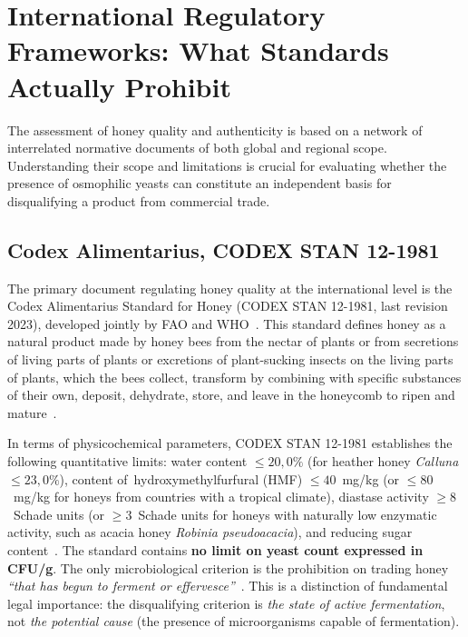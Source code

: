 
\section{International Regulatory Frameworks: What Standards Actually Prohibit}

The assessment of honey quality and authenticity is based on a network
of interrelated normative documents of both global and regional scope.
Understanding their scope and limitations is crucial for evaluating
whether the presence of osmophilic yeasts can constitute an independent
basis for disqualifying a product from commercial trade.

\subsection{Codex Alimentarius, CODEX STAN 12-1981}

The primary document regulating honey quality at the international
level is the Codex Alimentarius Standard for Honey
(CODEX STAN 12-1981, last revision 2023), developed jointly
by FAO and WHO~\cite{codex_stan12}. This standard defines honey
as a natural product made by honey bees from the nectar of plants
or from secretions of living parts of plants or excretions of
plant-sucking insects on the living parts of plants, which the bees
collect, transform by combining with specific substances of their own,
deposit, dehydrate, store, and leave in the honeycomb to ripen and
mature~\cite{codex_stan12}.

In terms of physicochemical parameters, CODEX STAN 12-1981 establishes
the following quantitative limits: water content $\leq 20{,}0\%$
(for heather honey \textit{Calluna} $\leq 23{,}0\%$), content
of~hydroxymethylfurfural (HMF) $\leq 40$~mg/kg (or $\leq 80$~mg/kg
for honeys from countries with a tropical climate), diastase
activity $\geq 8$~Schade units (or $\geq 3$~Schade units for honeys
with naturally low enzymatic activity, such as acacia honey
\textit{Robinia pseudoacacia}), and reducing sugar
content~\cite{codex_stan12}. The standard contains \textbf{no limit
on yeast count expressed in CFU/g}. The only microbiological criterion
is the prohibition on trading honey \emph{``that has begun to ferment
or effervesce''}~\cite{codex_stan12}. This is a distinction of
fundamental legal importance: the disqualifying criterion is
\emph{the state of active fermentation}, not \emph{the potential
cause} (the presence of microorganisms capable of fermentation).

